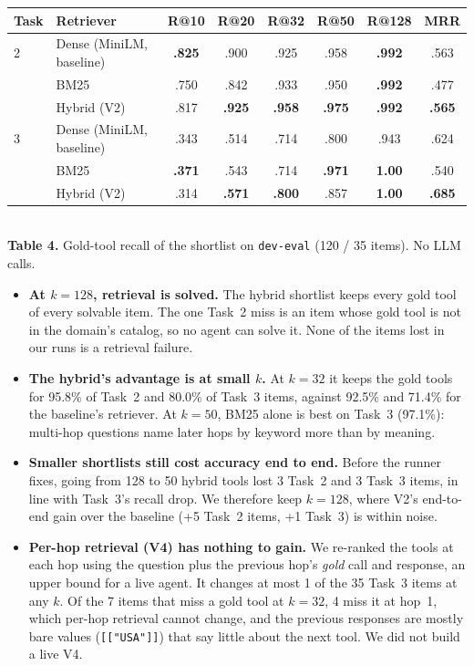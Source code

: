 \documentclass[10pt]{article}
\begin{document}
\begin{center}\small
\begin{tabular}{@{}llcccccc@{}}
\toprule
Task & Retriever & R@10 & R@20 & R@32 & R@50 & R@128 & MRR \\
\midrule
2 & Dense (MiniLM, baseline) & \textbf{.825} & .900 & .925 & .958 & \textbf{.992} & .563 \\
  & BM25                     & .750 & .842 & .933 & .950 & \textbf{.992} & .477 \\
  & Hybrid (V2)              & .817 & \textbf{.925} & \textbf{.958} & \textbf{.975} & \textbf{.992} & \textbf{.565} \\
\midrule
3 & Dense (MiniLM, baseline) & .343 & .514 & .714 & .800 & .943 & .624 \\
  & BM25                     & \textbf{.371} & .543 & .714 & \textbf{.971} & \textbf{1.00} & .540 \\
  & Hybrid (V2)              & .314 & \textbf{.571} & \textbf{.800} & .857 & \textbf{1.00} & \textbf{.685} \\
\bottomrule
\end{tabular}\\[0.2em]
{\footnotesize \textbf{Table 4.} Gold-tool recall of the shortlist on \texttt{dev-eval}
(120 / 35 items). No LLM calls.}
\end{center}

\begin{itemize}
\item \textbf{At $k{=}128$, retrieval is solved.} The hybrid shortlist keeps every gold tool of
  every solvable item. The one Task~2 miss is an item whose gold tool is not in the domain's
  catalog, so no agent can solve it. None of the items lost in our runs is a retrieval failure.
\item \textbf{The hybrid's advantage is at small $k$.} At $k{=}32$ it keeps the gold tools for
  95.8\% of Task~2 and 80.0\% of Task~3 items, against 92.5\% and 71.4\% for the baseline's
  retriever. At $k{=}50$, BM25 alone is best on Task~3 (97.1\%): multi-hop questions name later
  hops by keyword more than by meaning.
\item \textbf{Smaller shortlists still cost accuracy end to end.} Before the runner fixes,
  going from 128 to 50 hybrid tools lost 3 Task~2 and 3 Task~3 items, in line with Task~3's
  recall drop. We therefore keep $k{=}128$, where V2's end-to-end gain over the baseline
  (+5 Task~2 items, +1 Task~3) is within noise.
\item \textbf{Per-hop retrieval (V4) has nothing to gain.} We re-ranked the tools at each hop
  using the question plus the previous hop's \emph{gold} call and response, an upper bound for a
  live agent. It changes at most 1 of the 35 Task~3 items at any $k$. Of the 7 items that miss a
  gold tool at $k{=}32$, 4 miss it at hop~1, which per-hop retrieval cannot change, and the
  previous responses are mostly bare values (\texttt{[["USA"]]}) that say little about the next
  tool. We did not build a live V4.
\end{itemize}
\end{document}
